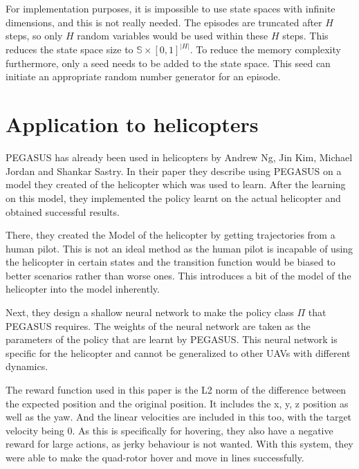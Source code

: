 \documentclass[hidelinks,BTech]{iitmdiss}
\begin{document}
For implementation purposes, it is impossible to use state spaces with infinite dimensions, and this is not really needed. The episodes are truncated after $H$ steps, so only $H$ random variables would be used within these $H$ steps. This reduces the state space size to $\mathbb{S} \times [0,1]^{|H|}$. To reduce the memory complexity furthermore, only a seed needs to be added to the state space. This seed can initiate an appropriate random number generator for an episode.

\section{Application to helicopters}

PEGASUS has already been used in helicopters \cite{HelicopterPegasus}  by Andrew Ng, Jin Kim, Michael Jordan and Shankar Sastry. In their paper they describe using PEGASUS on a model they created of the helicopter which was used to learn. After the learning on this model, they implemented the policy learnt on the actual helicopter and obtained successful results.

There, they created the Model of the helicopter by getting trajectories from a human pilot. This is not an ideal method as the human pilot is incapable of using the helicopter in certain states and the transition function would be biased to better scenarios rather than worse ones. This introduces a bit of the model of the helicopter into the model inherently.

Next, they design a shallow neural network to make the policy class $\Pi$ that PEGASUS requires. The weights of the neural network are taken as the parameters of the policy that are learnt by PEGASUS. This neural network is specific for the helicopter and cannot be generalized to other UAVs with different dynamics.

The reward function used in this paper is the L2 norm of the difference between the expected position and the original position. It includes the x, y, z position as well as the yaw. And the linear velocities are included in this too, with the target velocity being 0. As this is specifically for hovering, they also have a negative reward for large actions, as jerky behaviour is not wanted. With this system, they were able to make the quad-rotor hover and move in lines successfully.
\end{document}
